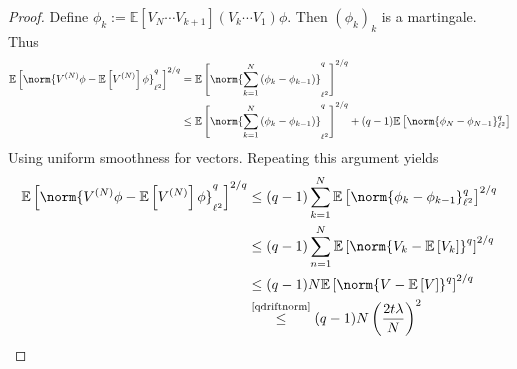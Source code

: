 \begin{proof}
    Define \( \phi_k:= \mathbb{E}\left[V_N \cdots V_{k+1}\right] \left(V_k \cdots V_1\right) \phi \). Then \( (\phi_k)_k \) is a martingale. Thus 
    \begin{align*}
      \mathbb{E}\left[\norm{V^{(N)} \phi - \mathbb{E}\left[V^{(N)}\right]\phi }_{\ell^{2}}^{q}\right]^{2/q} &= \mathbb{E}\left[\norm{\sum_{k=1}^{N}\left(\phi_k - \phi_{k-1}\right)}_{\ell^{2}}^{q}\right]^{2/q} \\
                                                                                                            &\leq \mathbb{E}\left[\norm{\sum_{k=1}^{N}\left(\phi_k-\phi_{k-1}\right)}_{\ell^{2}}^{q}\right]^{2/q} + (q-1) \mathbb{E}\left[\norm{\phi_{N}-\phi_{N-1}}_{\ell^{2}}^{q}\right]
    \end{align*}
    Using uniform smoothness for vectors. Repeating this argument yields
    \begin{align*}
      \mathbb{E}\left[\norm{V^{(N)} \phi - \mathbb{E}\left[V^{(N)}\right]\phi }_{\ell^{2}}^{q}\right]^{2/q} &\leq (q-1)\sum_{k=1}^{N} \mathbb{E}\left[\norm{\phi_k-\phi_{k-1}}_{\ell^{2}}^{q}\right]^{2/q} \\
                                                                                                            &\leq (q-1) \sum_{n=1}^{N} \mathbb{E}\left[\norm{V_k-\mathbb{E}\left[V_k\right]}_{}^{q}\right]^{2/q} \\
                                                                                                            &\leq (q-1)N \mathbb{E}\left[\norm{V-\mathbb{E}\left[V\right]}_{}^{q}\right]^{2/q} \\
                                                                                                            & \overset{\text{\ref{qdriftnorm}}}{\leq} (q-1)N \left(\frac{2t\lambda}{N}  \right)^{2}
    \end{align*}
\end{proof}

